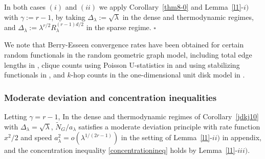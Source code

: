 \documentclass[12pt]{article}
\newtheorem{remark}[prop]{Remark}
\newenvironment{Proof}{\removelastskip\par\medskip
\noindent{\em Proof.} \rm}{\penalty-20\null\hfill$\square$\par\medbreak}
\numberwithin{equation}{section}
\begin{document}
\begin{Proof}
  In both cases $(i)$ and $(ii)$ we apply Corollary~\ref{thm8-0} 
  and Lemma~\ref{l1}-$i)$ with $\gamma :=r-1$,
  by taking 
  $\Delta_\lambda:=
  \sqrt{\lambda}$
  in the dense and  thermodynamic regimes,
  and 
  $\Delta_\lambda:= \lambda^{r/2} R_\lambda^{(r-1)d/2}$
  in the sparse regime.
\end{Proof} 
We note that Berry-Esseen convergence rates have been obtained
for certain random functionals in the random geometric graph
model, including total edge lengths in \cite[Corollary~4.3]{schulte},
clique counts using Poisson U-statistics in \cite[Theorem~4.1]{reitzner}  
and using stabilizing functionals in \cite[Theorem~3.15]{lachiezerey4},
and $k$-hop counts in the one-dimensional unit disk model in
\cite[Proposition~8.1]{privaultkhops}. 



\subsubsection*{Moderate deviation and concentration inequalities} 
\noindent 
Letting $\gamma =r-1$, 
In the dense and thermodynamic regimes of 
Corollary~\ref{jdkj10} with $\Delta_\lambda=
\sqrt{\lambda}$, $\widetilde{N}_G/a_\lambda$
    satisfies a moderate deviation principle
with rate function $x^2/2$
and speed $a_\lambda^2 = o( \lambda^{1/(2r - 1)} )$
in the setting of Lemma~\ref{l1}-$ii)$ in appendix,
and the concentration inequality 
\eqref{concentrationineq} holds by Lemma~\ref{l1}-$iii)$. 
\end{document}
